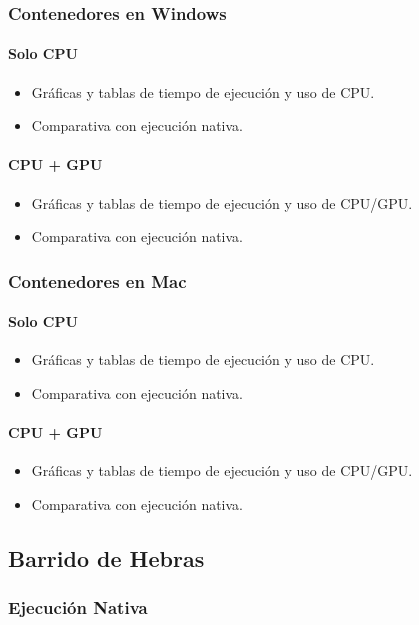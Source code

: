 \subsubsection{Contenedores en Windows}
\paragraph{Solo CPU}
\begin{itemize}
    \item Gráficas y tablas de tiempo de ejecución y uso de CPU.
    \item Comparativa con ejecución nativa.
\end{itemize}
\paragraph{CPU + GPU}
\begin{itemize}
    \item Gráficas y tablas de tiempo de ejecución y uso de CPU/GPU.
    \item Comparativa con ejecución nativa.
\end{itemize}
\subsubsection{Contenedores en Mac}
\paragraph{Solo CPU}
\begin{itemize}
    \item Gráficas y tablas de tiempo de ejecución y uso de CPU.
    \item Comparativa con ejecución nativa.
\end{itemize}
\paragraph{CPU + GPU}
\begin{itemize}
    \item Gráficas y tablas de tiempo de ejecución y uso de CPU/GPU.
    \item Comparativa con ejecución nativa.
\end{itemize}

\subsection{Barrido de Hebras}
\subsubsection{Ejecución Nativa}
